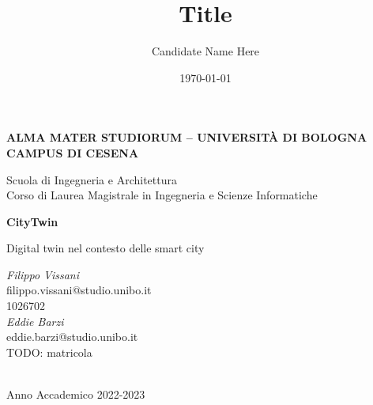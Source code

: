 \title{Title}
\author{Candidate Name Here}
\date{\today}

\begin{titlepage}
	\begin{center}
		
		\large
		\textbf{ALMA MATER STUDIORUM -- UNIVERSITÀ DI BOLOGNA \\ CAMPUS DI CESENA}
		\\
		\noindent\hrulefill
		\vspace{0.4cm}
		
		\Large
		Scuola di Ingegneria e Architettura \\
		Corso di Laurea Magistrale in Ingegneria e Scienze Informatiche
		
		\Huge
		\vspace{4cm}
		\textbf{
			CityTwin
		}
		
		\large
		\vspace{1cm}
		Digital twin nel contesto delle smart city
		\\
		\vspace{5.5cm}
		\begin{minipage}[t]{0.64\textwidth}
			\begin{flushleft} 
				\textit{Filippo Vissani}
				\\
				filippo.vissani@studio.unibo.it
				\\
				1026702
				\\
				\vspace{0.4cm}
				\textit{Eddie Barzi}
				\\
				eddie.barzi@studio.unibo.it
				\\ TODO: matricola
			\end{flushleft}
		\end{minipage}
		
		\vfill
		\noindent\hrulefill
		\vspace{0.3cm}
		\Large
		\\
		Anno Accademico 2022-2023
	\end{center}
\end{titlepage}
\restoregeometry
